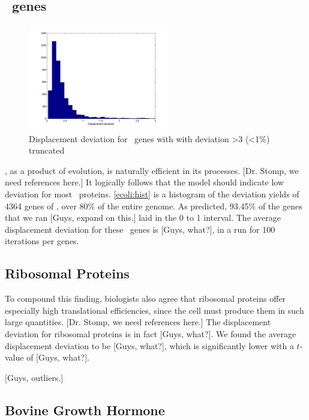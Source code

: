 \documentclass[12pt, draft]{article}
\numberwithin{equation}{section}
\begin{document}
\subsection{\ecoli\ genes}

\begin{figure}
  \centering
  \caption{Displacement deviation for \ecoli\ genes with with
    deviation >3 (<1\%) truncated}
  \label{ecoli:hist}
  \includegraphics[width=0.55\textwidth]{histograms/everything}
\end{figure}

\ecoli, as a product of evolution, is naturally efficient in its
processes. [Dr. Stomp, we need references here.]
It logically follows that the model should indicate low deviation
for most \ecoli\ proteins.
\autoref{ecoli:hist} is a histogram of the deviation yields of 4364 genes of
\ecoli, over 80\% of the entire genome.  As predicted, 93.45\% of the genes that we ran
[Guys, expand on this.] laid in the 0 to 1 interval.  The average displacement deviation
for these \ecoli\ genes is [Guys, what?], in a run for 100 iterations per genes.

\subsection{Ribosomal Proteins}
To compound this finding, biologists also agree that ribosomal
proteins offer especially high translational efficiencies, since the
cell must produce them in such large quantities. [Dr. Stomp, we need
  references here.] The displacement deviation for ribosomal proteins
is in fact [Guys, what?]. We found the average displacement deviation
to be [Guys, what?], which is significantly lower with a $t$-value of
[Guys, what?].

[Guys, outliers.]

\subsection{Bovine Growth Hormone}
\label{section:bgh}
\end{document}
